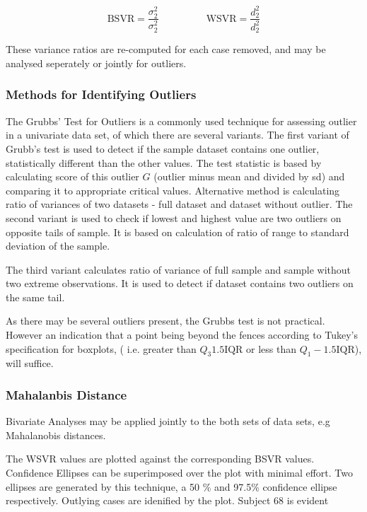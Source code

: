 \documentclass[12pt, a4paper]{report}
\theoremstyle{plain}
\theoremstyle{definition}
\theoremstyle{remark}
\begin{document}
	
	\[ \mbox{BSVR} = \frac{\sigma^2_2}{\sigma^2_2} \phantom{makespace}  \mbox{WSVR} = \frac{d^2_2}{d^2_2} \]
	
	These variance ratios are re-computed for each case removed, and may be analysed seperately or jointly for outliers. 
	


	
	\subsubsection{Methods for Identifying Outliers}
	The Grubbs' Test for Outliers is a commonly used technique for assessing outlier in a univariate data set, of which there are several variants. The first variant of Grubb's test is used to detect if the sample dataset contains one outlier, statistically different than
	the other values. The test statistic is based by calculating score of this outlier $G$ (outlier minus mean and divided
	by sd) and comparing it to appropriate critical values. Alternative method is calculating ratio of
	variances of two datasets - full dataset and dataset without outlier. 
	The second variant is used to check if lowest and highest value are two outliers on opposite tails of sample. It is based on calculation of ratio of range to standard deviation of the sample.
	
	The third variant calculates ratio of variance of full sample and sample without two extreme observations.
	It is used to detect if dataset contains two outliers on the same tail.
	
	As there may be several outliers present, the Grubbs test is not practical. However an indication that a point being beyond the fences according to Tukey's 
	specification for boxplots, ( i.e. greater than $Q_3 1.5 \mbox{IQR}$ or less than $Q_1 - 1.5 \mbox{IQR}$), will suffice.
	
	


	\subsubsection{Mahalanbis Distance}
	Bivariate Analyses may be applied jointly to the both sets of data sets, e.g Mahalanobis distances.
	
	The WSVR values are plotted against the corresponding BSVR values. Confidence Ellipses can be superimposed over the plot with minimal effort. Two ellipses are generated by this technique, a 50 \% and 97.5\% confidence ellipse respectively. Outlying cases are idenified by the plot. Subject 68 is evident
	
\end{document}
